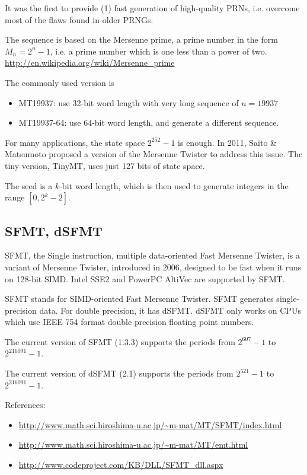It was the first to provide (1) fast generation of high-quality PRNs, i.e. overcome most of the flaws found in older PRNGs.

The sequence is based on the Mersenne prime, a prime number in the form $M_n =
2^n-1$, i.e. a prime number which is one less than a power of two.
\url{http://en.wikipedia.org/wiki/Mersenne_prime}

The commonly used version is 
\begin{itemize}
  \item MT19937: use 32-bit word length with very long sequence of $n=19937$
  
  \item MT19937-64: use 64-bit word length, and generate a different sequence.
\end{itemize}

For many applications, the state space $2^{252}-1$ is enough.
In 2011, Saito \& Matsumoto proposed a version of the Mersenne Twister to
address this issue. The tiny version, TinyMT, uses just 127 bits of state space.

The seed is a $k$-bit word length, which is then used to generate integers in the range $[0, 2^k-2]$.


\subsection{SFMT, dSFMT}
\label{sec:sfmt}
\label{sec:dSFMTs}

SFMT, the Single instruction, multiple data-oriented Fast Mersenne Twister, is a
variant of Mersenne Twister, introduced in 2006, designed to be fast when it
runs on 128-bit SIMD. Intel SSE2 and PowerPC AltiVec are supported by SFMT.

SFMT stands for SIMD-oriented Fast Mersenne Twister. SFMT generates
single-precision data. For double precision, it has dSFMT.
dSFMT only works on CPUs which use IEEE 754 format double precision
floating point numbers.

The current version of SFMT (1.3.3) supports the periods from
$2^{607}-1$ to $2^{216091}-1$.

The current version of dSFMT (2.1) supports the periods from
$2^{521}-1$ to $2^{216091}-1$.

References:
\begin{itemize}
\item
  \url{http://www.math.sci.hiroshima-u.ac.jp/~m-mat/MT/SFMT/index.html}
\item \url{http://www.math.sci.hiroshima-u.ac.jp/~m-mat/MT/emt.html}
\item \url{http://www.codeproject.com/KB/DLL/SFMT_dll.aspx}
\end{itemize}



